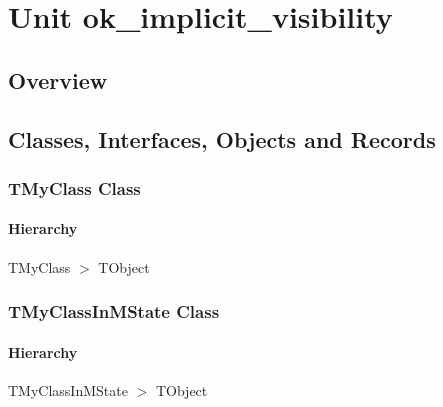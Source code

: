 \documentclass{report}
\newif\ifpdf
\begin{document}
\label{toc}\tableofcontents
\newpage
\newlength{\tmplength}
\chapter{Unit ok{\_}implicit{\_}visibility}
\label{ok_implicit_visibility}
\section{Overview}
\begin{description}
\item[\texttt{\begin{ttfamily}TMyClass\end{ttfamily} Class}]
\item[\texttt{\begin{ttfamily}TMyClassInMState\end{ttfamily} Class}]
\end{description}
\section{Classes, Interfaces, Objects and Records}
\ifpdf
\subsection*{\large{\textbf{TMyClass Class}}\normalsize\hspace{1ex}\hrulefill}
\else
\subsection*{TMyClass Class}
\fi
\label{ok_implicit_visibility.TMyClass}
\subsubsection*{\large{\textbf{Hierarchy}}\normalsize\hspace{1ex}\hfill}
TMyClass {$>$} TObject
\ifpdf
\subsection*{\large{\textbf{TMyClassInMState Class}}\normalsize\hspace{1ex}\hrulefill}
\else
\subsection*{TMyClassInMState Class}
\fi
\label{ok_implicit_visibility.TMyClassInMState}
\subsubsection*{\large{\textbf{Hierarchy}}\normalsize\hspace{1ex}\hfill}
TMyClassInMState {$>$} TObject
\end{document}
